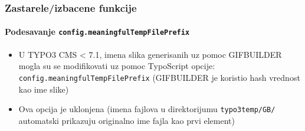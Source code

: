 
\begin{frame}[fragile]
	\frametitle{Zastarele/izbacene funkcije}
	\framesubtitle{Podesavanje \texttt{config.meaningfulTempFilePrefix}}

	\begin{itemize}

		\item U TYPO3 CMS < 7.1, imena slika generisanih uz pomoc GIFBUILDER mogla su se modifikovati uz pomoc TypoScript opcije:\newline
			\texttt{config.meaningfulTempFilePrefix}\newline
			\small
				(GIFBUILDER je koristio hash vrednost kao ime slike)
			\normalsize

		\item Ova opcija je uklonjena (imena fajlova u direktorijumu \texttt{typo3temp/GB/}
			automatski prikazuju originalno ime fajla kao prvi element)

	\end{itemize}

\end{frame}




